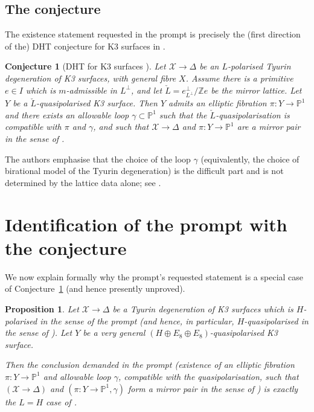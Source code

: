 \documentclass[11pt]{amsart}
\newtheorem{proposition}[theorem]{Proposition}
\newtheorem{conjecture}[theorem]{Conjecture}
\theoremstyle{definition}
\newcommand{\Z}{\mathbb Z}
\newcommand{\PP}{\mathbb P}
\begin{document}
\subsection{The conjecture}
The existence statement requested in the prompt is precisely the (first direction of the) DHT conjecture
for K3 surfaces in \cite{dfk3slpms}.

\begin{conjecture}[DHT for K3 surfaces {\cite[Conjecture~5.10]{dfk3slpms}}]\label{conj:DHT}
Let $\mathcal X\to \Delta$ be an $L$-polarised Tyurin degeneration of K3 surfaces, with general fibre $X$.
Assume there is a primitive $e\in I$ which is $m$-admissible in $L^\perp$, and let $\check L=e^\perp_{L^\perp}/\Z e$
be the mirror lattice. Let $Y$ be a $\check L$-quasipolarised K3 surface. Then $Y$ admits an elliptic fibration
$\pi:Y\to \PP^1$ and there exists an allowable loop $\gamma\subset \PP^1$ such that the $\check L$-quasipolarisation
is compatible with $\pi$ and $\gamma$, and such that $\mathcal X\to \Delta$ and $\pi:Y\to \PP^1$ are a mirror pair in
the sense of \cite[Definition~5.1]{dfk3slpms}.
\end{conjecture}

The authors emphasise that the choice of the loop $\gamma$ (equivalently, the choice of birational model of the Tyurin
degeneration) is the difficult part and is not determined by the lattice data alone; see
\cite[Remark~5.11]{dfk3slpms}.

\section{Identification of the prompt with the conjecture}

We now explain formally why the prompt's requested statement is a special case of Conjecture~\ref{conj:DHT}
(and hence presently unproved).

\begin{proposition}\label{prop:prompt-equals-conj}
Let $\mathcal X\to \Delta$ be a Tyurin degeneration of K3 surfaces which is $H$-polarised in the sense of the prompt
(and hence, in particular, $H$-quasipolarised in the sense of \cite[Definition~3.19]{dfk3slpms}).
Let $Y$ be a very general $(H\oplus E_8\oplus E_8)$-quasipolarised K3 surface.

Then the conclusion demanded in the prompt (existence of an elliptic fibration $\pi:Y\to \PP^1$ and allowable loop
$\gamma$, compatible with the quasipolarisation, such that $(\mathcal X\to \Delta)$ and $(\pi:Y\to \PP^1,\gamma)$ form a
mirror pair in the sense of \cite[Definition~5.1]{dfk3slpms}) is exactly the $L=H$ case of
\cite[Conjecture~5.10]{dfk3slpms}.
\end{proposition}
\end{document}
